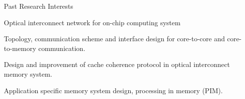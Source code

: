 \documentclass{resume} %
\begin{document}
\begin{rSection}{Past Research Interests}
\begin{rSubsection}{Optical interconnect network for on-chip computing system}{}{}{}
\item Topology, communication scheme and interface design for core-to-core and core-to-memory communication.
\item Design and improvement of cache coherence protocol in optical interconnect memory system.
\item Application specific memory system design, processing in memory (PIM).
\end{rSubsection}

\end{rSection}

\end{document}
